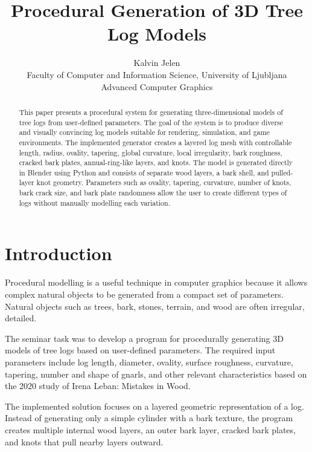 \documentclass{egpubl}
\title[Procedural Generation of 3D Tree Logs]%
      {Procedural Generation of 3D Tree Log Models}
\author[K. Jelen]
       {Kalvin Jelen\\
        Faculty of Computer and Information Science, University of Ljubljana\\
        Advanced Computer Graphics}
\begin{document}
\maketitle

\begin{abstract}
This paper presents a procedural system for generating three-dimensional models of tree logs from user-defined parameters. The goal of the system is to produce diverse and visually convincing log models suitable for rendering, simulation, and game environments. The implemented generator creates a layered log mesh with controllable length, radius, ovality, tapering, global curvature, local irregularity, bark roughness, cracked bark plates, annual-ring-like layers, and knots. The model is generated directly in Blender using Python and consists of separate wood layers, a bark shell, and pulled-layer knot geometry. Parameters such as ovality, tapering, curvature, number of knots, bark crack size, and bark plate randomness allow the user to create different types of logs without manually modelling each variation.
\end{abstract}


\section{Introduction}

Procedural modelling is a useful technique in computer graphics because it allows complex natural objects to be generated from a compact set of parameters. Natural objects such as trees, bark, stones, terrain, and wood are often irregular, detailed.

The seminar task was to develop a program for procedurally generating 3D models of tree logs based on user-defined parameters. The required input parameters include log length, diameter, ovality, surface roughness, curvature, tapering, number and shape of gnarls, and other relevant characteristics based on the 2020 study of Irena Leban: Mistakes in Wood.~\cite{basa2020napake}

The implemented solution focuses on a layered geometric representation of a log. Instead of generating only a simple cylinder with a bark texture, the program creates multiple internal wood layers, an outer bark layer, cracked bark plates, and knots that pull nearby layers outward.

\end{document}
